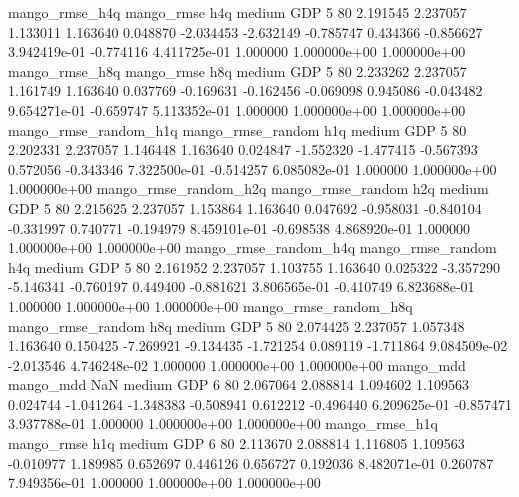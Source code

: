        mango_rmse_h4q        mango_rmse                  h4q     medium      GDP                 5 80  2.191545       2.237057 1.133011       1.163640    0.048870     -2.034453     -2.632149    -0.785747       0.434366 -0.856627 3.942419e-01    -0.774116   4.411725e-01            1.000000    1.000000e+00        1.000000e+00
       mango_rmse_h8q        mango_rmse                  h8q     medium      GDP                 5 80  2.233262       2.237057 1.161749       1.163640    0.037769     -0.169631     -0.162456    -0.069098       0.945086 -0.043482 9.654271e-01    -0.659747   5.113352e-01            1.000000    1.000000e+00        1.000000e+00
mango_rmse_random_h1q mango_rmse_random                  h1q     medium      GDP                 5 80  2.202331       2.237057 1.146448       1.163640    0.024847     -1.552320     -1.477415    -0.567393       0.572056 -0.343346 7.322500e-01    -0.514257   6.085082e-01            1.000000    1.000000e+00        1.000000e+00
mango_rmse_random_h2q mango_rmse_random                  h2q     medium      GDP                 5 80  2.215625       2.237057 1.153864       1.163640    0.047692     -0.958031     -0.840104    -0.331997       0.740771 -0.194979 8.459101e-01    -0.698538   4.868920e-01            1.000000    1.000000e+00        1.000000e+00
mango_rmse_random_h4q mango_rmse_random                  h4q     medium      GDP                 5 80  2.161952       2.237057 1.103755       1.163640    0.025322     -3.357290     -5.146341    -0.760197       0.449400 -0.881621 3.806565e-01    -0.410749   6.823688e-01            1.000000    1.000000e+00        1.000000e+00
mango_rmse_random_h8q mango_rmse_random                  h8q     medium      GDP                 5 80  2.074425       2.237057 1.057348       1.163640    0.150425     -7.269921     -9.134435    -1.721254       0.089119 -1.711864 9.084509e-02    -2.013546   4.746248e-02            1.000000    1.000000e+00        1.000000e+00
            mango_mdd         mango_mdd                  NaN     medium      GDP                 6 80  2.067064       2.088814 1.094602       1.109563    0.024744     -1.041264     -1.348383    -0.508941       0.612212 -0.496440 6.209625e-01    -0.857471   3.937788e-01            1.000000    1.000000e+00        1.000000e+00
       mango_rmse_h1q        mango_rmse                  h1q     medium      GDP                 6 80  2.113670       2.088814 1.116805       1.109563   -0.010977      1.189985      0.652697     0.446126       0.656727  0.192036 8.482071e-01     0.260787   7.949356e-01            1.000000    1.000000e+00        1.000000e+00

